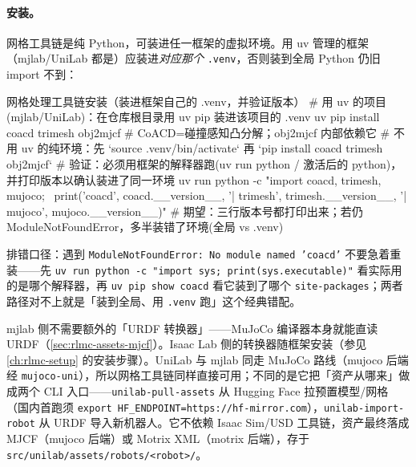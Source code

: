 \paragraph{安装。}网格工具链是纯 Python，可装进任一框架的虚拟环境。用 uv 管理的框架（mjlab/UniLab 都是）应装进\emph{对应那个} \texttt{.venv}，否则装到全局 Python 仍旧 import 不到：

\begin{codebox}[bash]{网格处理工具链安装（装进框架自己的 .venv，并验证版本）}
# 用 uv 的项目(mjlab/UniLab)：在仓库根目录用 uv pip 装进该项目的 .venv
uv pip install coacd trimesh obj2mjcf      # CoACD=碰撞感知凸分解；obj2mjcf 内部依赖它
# 不用 uv 的纯环境：先 `source .venv/bin/activate` 再 `pip install coacd trimesh obj2mjcf`
# 验证：必须用框架的解释器跑(uv run python / 激活后的 python)，并打印版本以确认装进了同一环境
uv run python -c "import coacd, trimesh, mujoco; \
print('coacd', coacd.__version__, '| trimesh', trimesh.__version__, '| mujoco', mujoco.__version__)"
# 期望：三行版本号都打印出来；若仍 ModuleNotFoundError，多半装错了环境(全局 vs .venv)
\end{codebox}

排错口径：遇到 \texttt{ModuleNotFoundError: No module named 'coacd'} 不要急着重装——先 \texttt{uv run python -c "import sys; print(sys.executable)"} 看实际用的是哪个解释器，再 \texttt{uv pip show coacd} 看它装到了哪个 \texttt{site-packages}；两者路径对不上就是「装到全局、用 \texttt{.venv} 跑」这个经典错配。

mjlab 侧不需要额外的「URDF 转换器」——MuJoCo 编译器本身就能直读 URDF（\cref{sec:rlmc-assets-mjcf}）。Isaac Lab 侧的转换器随框架安装（参见 \cref{ch:rlmc-setup} 的安装步骤）。UniLab 与 mjlab 同走 MuJoCo 路线（mujoco 后端经 \texttt{mujoco-uni}），所以网格工具链同样直接可用；不同的是它把「资产从哪来」做成两个 CLI 入口——\texttt{unilab-pull-assets} 从 Hugging Face 拉预置模型/网格（国内首跑须 \verb|export HF_ENDPOINT=https://hf-mirror.com|），\texttt{unilab-import-robot} 从 URDF 导入新机器人。它不依赖 Isaac Sim/USD 工具链，资产最终落成 MJCF（mujoco 后端）或 Motrix XML（motrix 后端），存于 \verb|src/unilab/assets/robots/<robot>/|。

